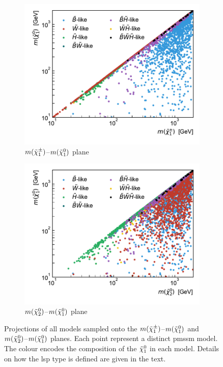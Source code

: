  \begin{figure}
	\centering
	\begin{subfigure}[b]{0.5\linewidth}
		\centering\includegraphics[width=\textwidth]{scatter/lsp_types.pdf}
		\vspace{-2.5em}
		\caption{$m(\tilde{\chi}_1^\pm)$--$m(\tilde{\chi}_1^0)$ plane\label{fig:lsp_types}}
	\end{subfigure}\hfill
	\begin{subfigure}[b]{0.5\linewidth}
		\centering\includegraphics[width=\textwidth]{scatter/lsp_types_N2.pdf}
		\vspace{-2.5em}
		\caption{$m(\tilde{\chi}_2^0)$--$m(\tilde{\chi}_1^0)$ plane\label{fig:lsp_types_N2}}
	\end{subfigure}\hfill
	\caption{Projections of all models sampled onto the  $m(\tilde{\chi}_1^\pm)$--$m(\tilde{\chi}_1^0)$ and  $m(\tilde{\chi}_2^0)$--$m(\tilde{\chi}_1^0)$ planes. Each point represent a distinct \gls{pmssm} model. The colour encodes the composition of the $\tilde{\chi}_1^0$ in each model. Details on how the \gls{lsp} type is defined are given in the text.}
	\label{fig:lsp_phenomenology}
\end{figure}

